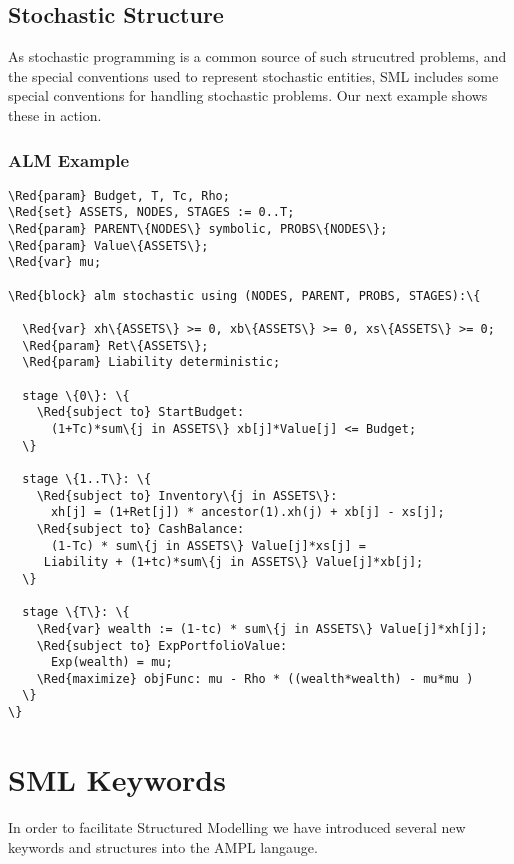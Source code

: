 \documentclass[10pt,a4paper]{book}
\begin{document}
\section{Stochastic Structure}

As stochastic programming is a common source of such strucutred problems, and
the special conventions used to represent stochastic entities, SML includes
some special conventions for handling stochastic problems. Our next example
shows these in action.

\subsection{ALM Example}

\begin{Verbatim}[frame=single,framerule=0.2pt,framesep=5pt,commandchars=\\\{\}]
\Red{param} Budget, T, Tc, Rho;
\Red{set} ASSETS, NODES, STAGES := 0..T;
\Red{param} PARENT\{NODES\} symbolic, PROBS\{NODES\};
\Red{param} Value\{ASSETS\};
\Red{var} mu;

\Red{block} alm stochastic using (NODES, PARENT, PROBS, STAGES):\{

  \Red{var} xh\{ASSETS\} >= 0, xb\{ASSETS\} >= 0, xs\{ASSETS\} >= 0;
  \Red{param} Ret\{ASSETS\};
  \Red{param} Liability deterministic;

  stage \{0\}: \{
    \Red{subject to} StartBudget:
      (1+Tc)*sum\{j in ASSETS\} xb[j]*Value[j] <= Budget;
  \}

  stage \{1..T\}: \{
    \Red{subject to} Inventory\{j in ASSETS\}:
      xh[j] = (1+Ret[j]) * ancestor(1).xh(j) + xb[j] - xs[j];
    \Red{subject to} CashBalance:
      (1-Tc) * sum\{j in ASSETS\} Value[j]*xs[j] = 
	 Liability + (1+tc)*sum\{j in ASSETS\} Value[j]*xb[j];
  \}

  stage \{T\}: \{
    \Red{var} wealth := (1-tc) * sum\{j in ASSETS\} Value[j]*xh[j];
    \Red{subject to} ExpPortfolioValue:
      Exp(wealth) = mu;
    \Red{maximize} objFunc: mu - Rho * ((wealth*wealth) - mu*mu )
  \}
\}
\end{Verbatim}

\chapter{SML Keywords}
In order to facilitate Structured Modelling we have introduced several new
keywords and structures into the AMPL langauge.
\end{document}
